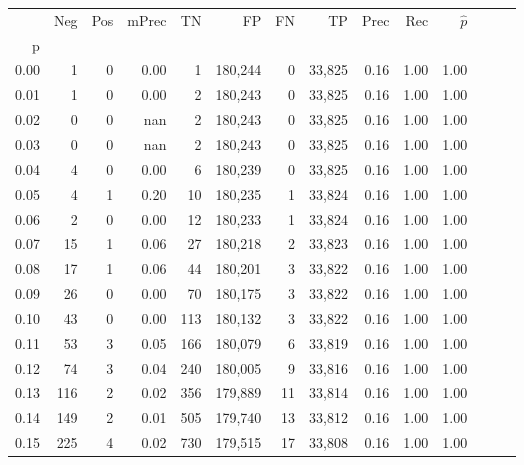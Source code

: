 \begin{tabular}{rrrrrrrrrrrrrr}
\toprule
{} &    Neg &    Pos & mPrec &       TN &       FP &      FN &      TP &  Prec &   Rec & $\hat{p}$ \\
p    &        &        &       &          &          &         &         &       &       &           \\
\midrule
0.00 &      1 &      0 &  0.00 &        1 &  180,244 &       0 &  33,825 &  0.16 &  1.00 &      1.00 \\
0.01 &      1 &      0 &  0.00 &        2 &  180,243 &       0 &  33,825 &  0.16 &  1.00 &      1.00 \\
0.02 &      0 &      0 &   nan &        2 &  180,243 &       0 &  33,825 &  0.16 &  1.00 &      1.00 \\
0.03 &      0 &      0 &   nan &        2 &  180,243 &       0 &  33,825 &  0.16 &  1.00 &      1.00 \\
0.04 &      4 &      0 &  0.00 &        6 &  180,239 &       0 &  33,825 &  0.16 &  1.00 &      1.00 \\
0.05 &      4 &      1 &  0.20 &       10 &  180,235 &       1 &  33,824 &  0.16 &  1.00 &      1.00 \\
0.06 &      2 &      0 &  0.00 &       12 &  180,233 &       1 &  33,824 &  0.16 &  1.00 &      1.00 \\
0.07 &     15 &      1 &  0.06 &       27 &  180,218 &       2 &  33,823 &  0.16 &  1.00 &      1.00 \\
0.08 &     17 &      1 &  0.06 &       44 &  180,201 &       3 &  33,822 &  0.16 &  1.00 &      1.00 \\
0.09 &     26 &      0 &  0.00 &       70 &  180,175 &       3 &  33,822 &  0.16 &  1.00 &      1.00 \\
0.10 &     43 &      0 &  0.00 &      113 &  180,132 &       3 &  33,822 &  0.16 &  1.00 &      1.00 \\
0.11 &     53 &      3 &  0.05 &      166 &  180,079 &       6 &  33,819 &  0.16 &  1.00 &      1.00 \\
0.12 &     74 &      3 &  0.04 &      240 &  180,005 &       9 &  33,816 &  0.16 &  1.00 &      1.00 \\
0.13 &    116 &      2 &  0.02 &      356 &  179,889 &      11 &  33,814 &  0.16 &  1.00 &      1.00 \\
0.14 &    149 &      2 &  0.01 &      505 &  179,740 &      13 &  33,812 &  0.16 &  1.00 &      1.00 \\
0.15 &    225 &      4 &  0.02 &      730 &  179,515 &      17 &  33,808 &  0.16 &  1.00 &      1.00 \\

\end{tabular}
